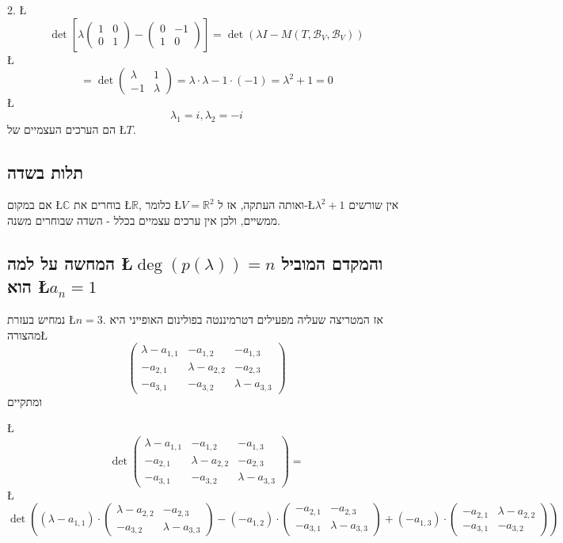 \documentclass[english,hebrew]{article}
\theoremstyle{plain}
\begin{document}
2. \L{%
\[
\det\left[\lambda\begin{pmatrix}1 & 0\\
0 & 1
\end{pmatrix}-\begin{pmatrix}0 & -1\\
1 & 0
\end{pmatrix}\right]=\det(\lambda I-M(T,\mathcal{B}_{V},\mathcal{B}_{V}))
\]
}%
\L{%
\[
=\det\begin{pmatrix}\lambda & 1\\
-1 & \lambda
\end{pmatrix}=\lambda\cdot\lambda-1\cdot\left(-1\right)=\lambda^{2}+1=0
\]
}%
\L{%
\[
\lambda_{1}=i,\lambda_{2}=-i
\]
}%
הם הערכים העצמיים של \L{$T$}.

\subsection{תלות בשדה}

אם במקום \L{$\mathbb{C}$} בוחרים את \L{$\mathbb{R}$}, כלומר \L{$V=\mathbb{R}^{2}$}
ואותה העתקה, אז ל-\L{$\lambda^{2}+1$} אין שורשים ממשיים, ולכן אין
ערכים עצמיים בכלל - השדה שבוחרים משנה.

\subsection{המחשה על למה \L{$\deg(p(\lambda))=n$} והמקדם המוביל הוא \L{$a_{n}=1$}}

נמחיש בעזרת \L{$n=3$}. אז המטריצה שעליה מפעילים דטרמיננטה בפולינום
האופייני היא מהצורה\L{%
\[
\begin{pmatrix}\lambda-a_{1,1} & -a_{1,2} & -a_{1,3}\\
-a_{2,1} & \lambda-a_{2,2} & -a_{2,3}\\
-a_{3,1} & -a_{3,2} & \lambda-a_{3,3}
\end{pmatrix}
\]
}%
ומתקיים

\L{%
\[
\det\begin{pmatrix}\lambda-a_{1,1} & -a_{1,2} & -a_{1,3}\\
-a_{2,1} & \lambda-a_{2,2} & -a_{2,3}\\
-a_{3,1} & -a_{3,2} & \lambda-a_{3,3}
\end{pmatrix}=
\]
}%
\L{%
\[
\det\left(\left(\lambda-a_{1,1}\right)\cdot\begin{pmatrix}\lambda-a_{2,2} & -a_{2,3}\\
-a_{3,2} & \lambda-a_{3,3}
\end{pmatrix}-\left(-a_{1,2}\right)\cdot\begin{pmatrix}-a_{2,1} & -a_{2,3}\\
-a_{3,1} & \lambda-a_{3,3}
\end{pmatrix}+\left(-a_{1,3}\right)\cdot\begin{pmatrix}-a_{2,1} & \lambda-a_{2,2}\\
-a_{3,1} & -a_{3,2}
\end{pmatrix}\right)
\]
}%
\end{document}
